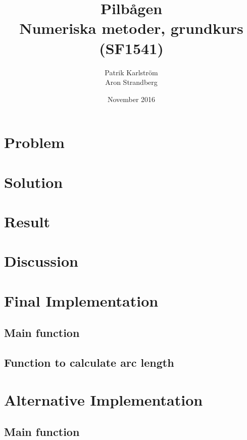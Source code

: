 \documentclass{article}
\title{Pilbågen \\  Numeriska metoder, grundkurs (SF1541)}
\author{Patrik Karlström \\ Aron Strandberg }
\date{November 2016}
\begin{document}
\maketitle

\section{Problem}



\section{Solution}



\section{Result}



\section{Discussion}



\newpage
\appendix
\section{Final Implementation} \label{app:Appendix A}

\subsection{Main function}


\subsection{Function to calculate arc length}


\section{Alternative Implementation} \label{app:Appendix B}

\subsection{Main function}

\end{document}
